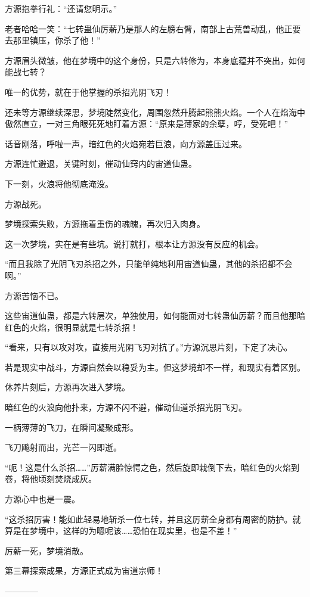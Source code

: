 \begin{this_body}
方源抱拳行礼：“还请您明示。”

老者哈哈一笑：“七转蛊仙厉薪乃是那人的左膀右臂，南部上古荒兽动乱，他正要去那里镇压，你杀了他！”

方源眉头微皱，他在梦境中的这个身份，只是六转修为，本身底蕴并不突出，如何能战七转？

唯一的优势，就在于他掌握的杀招光阴飞刃！

还未等方源继续深思，梦境陡然变化，周围忽然升腾起熊熊火焰。一个人在焰海中傲然直立，一对三角眼死死地盯着方源：“原来是薄家的余孽，哼，受死吧！”

话音刚落，呼啦一声，暗红色的火焰宛若巨浪，向方源盖压过来。

方源连忙避退，关键时刻，催动仙窍内的宙道仙蛊。

下一刻，火浪将他彻底淹没。

方源战死。

梦境探索失败，方源拖着重伤的魂魄，再次归入肉身。

这一次梦境，实在是有些坑。说打就打，根本让方源没有反应的机会。

“而且我除了光阴飞刃杀招之外，只能单纯地利用宙道仙蛊，其他的杀招都不会啊。”

方源苦恼不已。

这些宙道仙蛊，都是六转层次，单独使用，如何能面对七转蛊仙厉薪？而且他那暗红色的火焰，很明显就是七转杀招！

“看来，只有以攻对攻，直接用光阴飞刃对抗了。”方源沉思片刻，下定了决心。

若是现实中战斗，方源自然会以稳妥为主。但这梦境却不一样，和现实有着区别。

休养片刻后，方源再次进入梦境。

暗红色的火浪向他扑来，方源不闪不避，催动仙道杀招光阴飞刃。

一柄薄薄的飞刀，在瞬间凝聚成形。

飞刀飚射而出，光芒一闪即逝。

“呃！这是什么杀招……”厉薪满脸惊愕之色，然后旋即栽倒下去，暗红色的火焰到卷，将他顷刻焚烧成灰。

方源心中也是一震。

“这杀招厉害！能如此轻易地斩杀一位七转，并且这厉薪全身都有周密的防护。就算是在梦境中，这样的为嗯呢该……恐怕在现实里，也是不差！”

厉薪一死，梦境消散。

第三幕探索成果，方源正式成为宙道宗师！

------------

\end{this_body}

